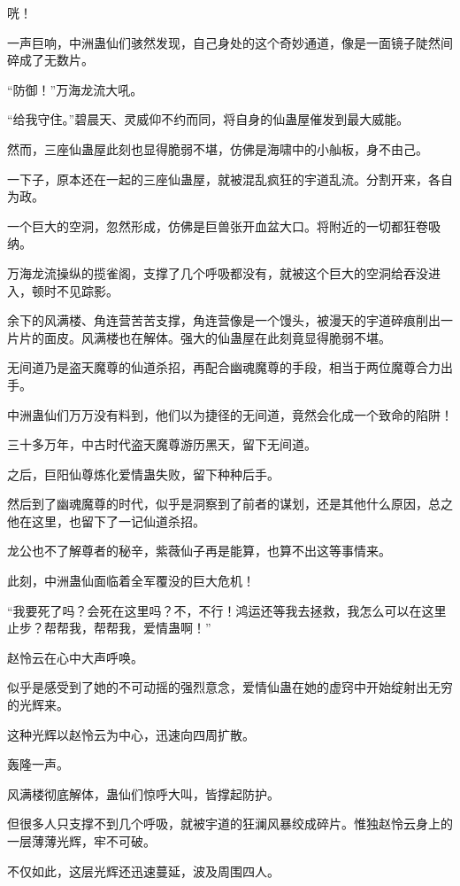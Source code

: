 \begin{this_body}
咣！

一声巨响，中洲蛊仙们骇然发现，自己身处的这个奇妙通道，像是一面镜子陡然间碎成了无数片。

“防御！”万海龙流大吼。

“给我守住。”碧晨天、灵威仰不约而同，将自身的仙蛊屋催发到最大威能。

然而，三座仙蛊屋此刻也显得脆弱不堪，仿佛是海啸中的小舢板，身不由己。

一下子，原本还在一起的三座仙蛊屋，就被混乱疯狂的宇道乱流。分割开来，各自为政。

一个巨大的空洞，忽然形成，仿佛是巨兽张开血盆大口。将附近的一切都狂卷吸纳。

万海龙流操纵的揽雀阁，支撑了几个呼吸都没有，就被这个巨大的空洞给吞没进入，顿时不见踪影。

余下的风满楼、角连营苦苦支撑，角连营像是一个馒头，被漫天的宇道碎痕削出一片片的面皮。风满楼也在解体。强大的仙蛊屋在此刻竟显得脆弱不堪。

无间道乃是盗天魔尊的仙道杀招，再配合幽魂魔尊的手段，相当于两位魔尊合力出手。

中洲蛊仙们万万没有料到，他们以为捷径的无间道，竟然会化成一个致命的陷阱！

三十多万年，中古时代盗天魔尊游历黑天，留下无间道。

之后，巨阳仙尊炼化爱情蛊失败，留下种种后手。

然后到了幽魂魔尊的时代，似乎是洞察到了前者的谋划，还是其他什么原因，总之他在这里，也留下了一记仙道杀招。

龙公也不了解尊者的秘辛，紫薇仙子再是能算，也算不出这等事情来。

此刻，中洲蛊仙面临着全军覆没的巨大危机！

“我要死了吗？会死在这里吗？不，不行！鸿运还等我去拯救，我怎么可以在这里止步？帮帮我，帮帮我，爱情蛊啊！”

赵怜云在心中大声呼唤。

似乎是感受到了她的不可动摇的强烈意念，爱情仙蛊在她的虚窍中开始绽射出无穷的光辉来。

这种光辉以赵怜云为中心，迅速向四周扩散。

轰隆一声。

风满楼彻底解体，蛊仙们惊呼大叫，皆撑起防护。

但很多人只支撑不到几个呼吸，就被宇道的狂澜风暴绞成碎片。惟独赵怜云身上的一层薄薄光辉，牢不可破。

不仅如此，这层光辉还迅速蔓延，波及周围四人。


\end{this_body}
